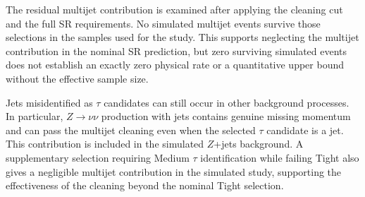The residual multijet contribution is examined after applying the cleaning cut and the full SR requirements.
No simulated multijet events survive those selections in the samples used for the study.
This supports neglecting the multijet contribution in the nominal SR prediction, but zero surviving simulated events does not establish an exactly zero physical rate or a quantitative upper bound without the effective sample size.

Jets misidentified as $\tau$ candidates can still occur in other background processes.
In particular, $Z\to\nu\nu$ production with jets contains genuine missing momentum and can pass the multijet cleaning even when the selected $\tau$ candidate is a jet.
This contribution is included in the simulated $Z$+jets background.
A supplementary selection requiring Medium $\tau$ identification while failing Tight also gives a negligible multijet contribution in the simulated study, supporting the effectiveness of the cleaning beyond the nominal Tight selection.
